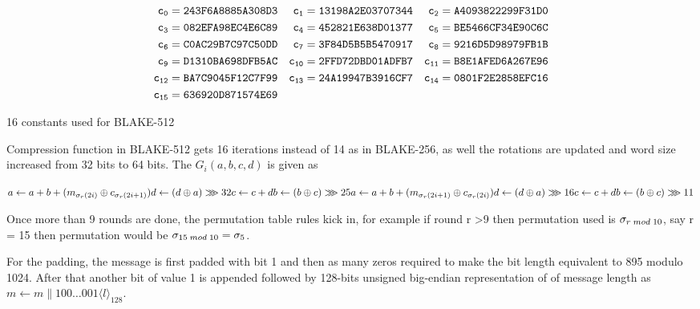   \begin{table}
    \begin{align*}
         {\tt c_{0}}  &= {\tt 243F6A8885A308D3} & {\tt c_{1}}  &= {\tt 13198A2E03707344} & {\tt c_{2}}  &= {\tt A4093822299F31D0} 
      \\ {\tt c_{3}}  &= {\tt 082EFA98EC4E6C89} & {\tt c_{4}}  &= {\tt 452821E638D01377} & {\tt c_{5}}  &= {\tt BE5466CF34E90C6C} 
      \\ {\tt c_{6}}  &= {\tt C0AC29B7C97C50DD} & {\tt c_{7}}  &= {\tt 3F84D5B5B5470917} & {\tt c_{8}}  &= {\tt 9216D5D98979FB1B} 
      \\ {\tt c_{9}}  &= {\tt D1310BA698DFB5AC} & {\tt c_{10}} &= {\tt 2FFD72DBD01ADFB7} & {\tt c_{11}} &= {\tt B8E1AFED6A267E96} 
      \\ {\tt c_{12}} &= {\tt BA7C9045F12C7F99} & {\tt c_{13}} &= {\tt 24A19947B3916CF7} & {\tt c_{14}} &= {\tt 0801F2E2858EFC16} 
      \\ {\tt c_{15}} &= {\tt 636920D871574E69} &                                        &      
    \end{align*}
    \caption{16 constants used for BLAKE-512 \cite{00002}}
  \end{table}
  
  Compression function in BLAKE-512 gets 16 iterations instead of 14 as in BLAKE-256, as well the rotations
  are updated and word size increased from 32 bits to 64 bits. The $G_{i}(a, b, c, d)$ 
  is given as 

  $
  a \gets a + b + (m_{\sigma_{r}(2i)} \oplus c_{\sigma_{r}(2i + 1)}) \\
  d \gets (d \oplus a) \ggg 32 \\
  c \gets c + d \\
  b \gets (b \oplus c) \ggg 25 \\
  a \gets a + b + (m_{\sigma_{r}(2i + 1)} \oplus c_{\sigma_{r}(2i)}) \\
  d \gets (d \oplus a) \ggg 16 \\
  c \gets c + d \\
  b \gets (b \oplus c) \ggg 11
  $
  
  Once more than 9 rounds are done, the permutation table rules kick in, for example if round r \textgreater 9 then
  permutation used is $\sigma_{r \thickspace mod \thickspace 10}$, say r = 15 then permutation would be 
  $\sigma_{15 \thickspace mod \thickspace 10} = \sigma_{5}$.

  For the padding, the message is first padded with bit 1 and then as many zeros required to make the bit length
  equivalent to 895 modulo 1024. After that another bit of value 1 is appended followed by 128-bits unsigned big-endian
  representation of of message length as $m \gets m \parallel 100 \dots 001 \langle l \rangle_{128}$.

